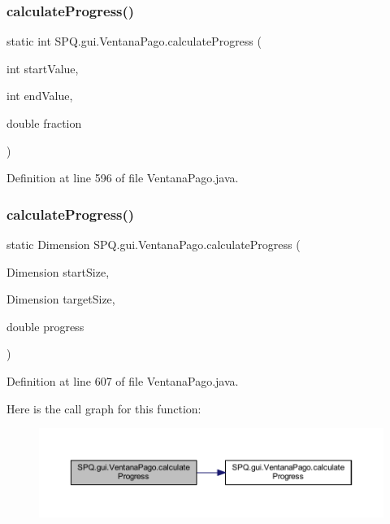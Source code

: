 \subsubsection{\texorpdfstring{calculate\+Progress()}{calculateProgress()}\hspace{0.1cm}{\footnotesize\ttfamily [3/4]}}
{\footnotesize\ttfamily static int S\+P\+Q.\+gui.\+Ventana\+Pago.\+calculate\+Progress (\begin{DoxyParamCaption}\item[{int}]{start\+Value,  }\item[{int}]{end\+Value,  }\item[{double}]{fraction }\end{DoxyParamCaption})\hspace{0.3cm}{\ttfamily [static]}}



Definition at line 596 of file Ventana\+Pago.\+java.

\mbox{\label{class_s_p_q_1_1gui_1_1_ventana_pago_a40ab2ece25e6d7c17d9704d5172be76c}} 
\subsubsection{\texorpdfstring{calculate\+Progress()}{calculateProgress()}\hspace{0.1cm}{\footnotesize\ttfamily [4/4]}}
{\footnotesize\ttfamily static Dimension S\+P\+Q.\+gui.\+Ventana\+Pago.\+calculate\+Progress (\begin{DoxyParamCaption}\item[{Dimension}]{start\+Size,  }\item[{Dimension}]{target\+Size,  }\item[{double}]{progress }\end{DoxyParamCaption})\hspace{0.3cm}{\ttfamily [static]}}



Definition at line 607 of file Ventana\+Pago.\+java.

Here is the call graph for this function\+:\nopagebreak
\begin{figure}[H]
\begin{center}
\leavevmode
\includegraphics[width=350pt]{class_s_p_q_1_1gui_1_1_ventana_pago_a40ab2ece25e6d7c17d9704d5172be76c_cgraph}
\end{center}
\end{figure}


